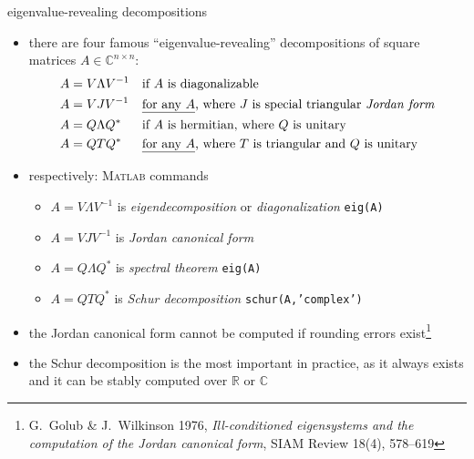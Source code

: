 \documentclass[10pt,hyperref]{beamer}
\newcommand{\CC}{\mathbb{C}}
\newcommand{\RR}{\mathbb{R}}
\newcommand{\Matlab}{\textsc{Matlab}\xspace}
\begin{document}
\begin{frame}{eigenvalue-revealing decompositions}

\begin{itemize}  
\item there are four famous ``eigenvalue-revealing'' decompositions of square matrices $A\in\CC^{n\times n}$:
\begin{align*}
A &= V \Lambda V^{-1} & &\text{if $A$ is diagonalizable} \\
A &= V J V^{-1} & &\text{\underline{for any $A$}, where $J$ is special triangular \emph{Jordan form}} \\
A &= Q \Lambda Q^* & &\text{if $A$ is hermitian, where $Q$ is unitary} \\
A &= Q T Q^* & &\text{\underline{for any $A$}, where $T$ is triangular and $Q$ is unitary}
\end{align*}
\item respectively: \hfill \small \Matlab commands\normalsize
    \begin{itemize}
    \item[] $A = V \Lambda V^{-1}$ is \emph{eigendecomposition} or \emph{diagonalization} \hfill \texttt{eig(A)}
    \item[] $A = V J V^{-1}$ is \emph{Jordan canonical form}
    \item[] $A = Q \Lambda Q^*$ is \emph{spectral theorem} \hfill \texttt{eig(A)}
    \item[] $A = Q T Q^*$ is \emph{Schur decomposition} \hfill \texttt{schur(A,'complex')}
    \end{itemize}

\medskip
\item the Jordan canonical form cannot be computed if rounding errors exist\footnote{\tiny G.~Golub \& J.~Wilkinson 1976, \emph{Ill-conditioned eigensystems and the computation of the Jordan canonical form}, SIAM Review 18(4), 578--619}
\item the Schur decomposition is the most important in practice, as it always exists and it can be stably computed over $\RR$ or $\CC$
\end{itemize}
\end{frame}
\end{document}

